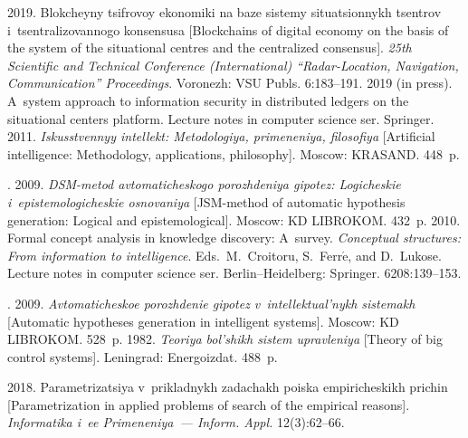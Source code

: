  \begin{multicols}{2}

\renewcommand{\bibname}{\protect\rmfamily References}

{\small\frenchspacing
 {\baselineskip=10.5pt
 \begin{thebibliography}{9}
 2019. Blokcheyny tsifrovoy ekonomiki 
na baze sistemy situatsionnykh tsentrov i~tsentralizovannogo konsensusa [Blockchains of digital 
economy on the basis of the system of the situational centres and the centralized consensus]. 
\textit{25th Scientific and Technical Conference (International) ``Radar-Location, Navigation, 
Communication'' Proceedings}. Voronezh: VSU Publs. 6:183--191.
 2019 (in press). 
A~system approach to information security 
in distributed ledgers on the situational centers platform. 
Lecture notes in computer science ser. Springer.
 2011. \textit{Iskusstvennyy intellekt: Metodologiya, primeneniya, filosofiya} 
[Artificial intelligence: Methodology, applications, philosophy]. Moscow: KRASAND. 448~p.

. 2009. \textit{DSM-metod avtomaticheskogo porozhdeniya gipotez: Logicheskie 
i~epistemologicheskie osnovaniya} [JSM-method of automatic hypothesis generation: Logical and 
epistemological]. Moscow: KD LIBROKOM. 432~p.
 2010. Formal concept analysis in 
knowledge discovery: A~survey. \textit{Conceptual structures: From information to intelligence}. 
Eds.\ M.~Croitoru, S.~Ferr$\acute{\mbox{e}}$, and D.~Lukose. Lecture notes in 
computer science ser. Berlin--Heidelberg: Springer. 6208:139--153.

. 
2009. \textit{Avtomaticheskoe porozhdenie gipotez v~intellektual'nykh 
sistemakh} [Automatic hypotheses generation in intelligent systems]. Moscow: KD 
\mbox{LIBROKOM}.  528~p. 
 1982. \textit{Teoriya bol'shikh 
sistem upravleniya} [Theory of big control systems]. Leningrad: Energoizdat. 488~p.

 2018. 
Parametrizatsiya v~prikladnykh zadachakh poiska empiricheskikh prichin 
[Parametrization in applied 
problems of search of the empirical reasons]. 
\textit{Informatika i~ee Primeneniya~--- 
Inform. Appl.} 12(3):62--66.


\end{thebibliography}}}
\end{multicols}
